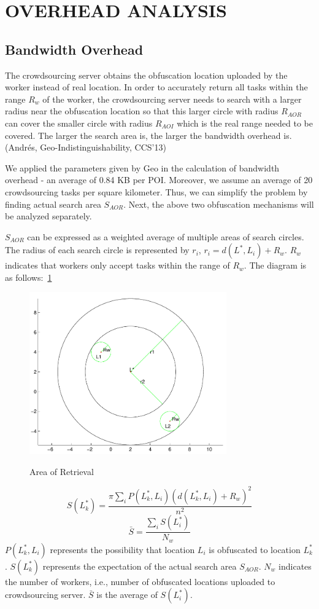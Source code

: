 \section{OVERHEAD ANALYSIS}
\subsection{Bandwidth Overhead}
The crowdsourcing server obtains the obfuscation location uploaded by the worker instead of real location. In order to accurately return all tasks within the range $R_w$ of the worker, the crowdsourcing server needs to search with a larger radius near the obfuscation location so that this larger circle with radius $R_{AOR}$ can cover the smaller circle with radius $R_{AOI}$ which is the real range needed to be covered. The larger the search area is, the larger the bandwidth overhead is. (Andrés, Geo-Indistinguishability, CCS’13)

We applied the parameters given by Geo in the calculation of bandwidth overhead - an average of 0.84 KB per POI. Moreover, we assume an average of 20 crowdsourcing tasks per square kilometer. Thus, we can simplify the problem by finding actual search area $S_{AOR}$. Next, the above two obfuscation mechanisms will be analyzed separately.

$S_{AOR}$ can be expressed as a weighted average of multiple areas of search circles. The radius of each search circle is represented by $r_i$, $r_i=d(L^*,L_i)+R_w$. $R_w$ indicates that workers only accept tasks within the range of $R_w$. The diagram is as follows:~\ref{img:AOR}

\begin{figure}
\includegraphics[width=8.5cm]{AOR}
\label{img:AOR}
\caption{Area of Retrieval}
\end{figure}

$$
	S(L^*_k)=\frac{\pi \sum_i P(L^*_k,L_i)(d(L^*_k,L_i)+R_w)^2}{n^2}
$$
$$
	\bar{S}=\frac{\sum_i S(L^*_i)}{N_w}
$$
$P(L^*_k,L_i)$ represents the possibility that location $L_i$ is obfuscated to location $L^*_k$. $S(L^*_k)$ represents the expectation of the actual search area $S_{AOR}$. $N_w$ indicates the number of workers, i.e., number of obfuscated locations uploaded to crowdsourcing server. $\bar{S}$ is the average of $S(L^*_i)$. 

